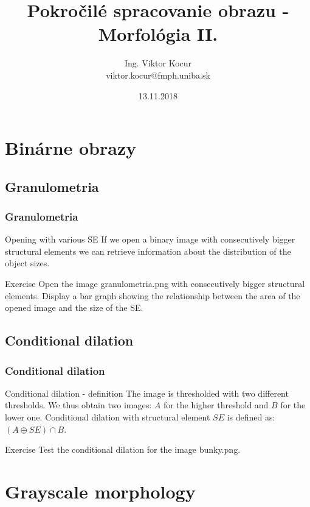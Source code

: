 \documentclass{beamer}
\title[8. cvičenie]{Pokročilé spracovanie obrazu - Morfológia II.}
\author[Kocur]{Ing. Viktor Kocur \\{\small viktor.kocur@fmph.uniba.sk}}
\institute{DAI FMFI UK}
\date{13.11.2018}
\begin{document}

\begin{frame}
  \titlepage
\end{frame}

\section{Binárne obrazy}
\subsection{Granulometria}

\begin{frame}
\frametitle{Granulometria}
  \begin{block}{Opening with various SE}
  If we open a binary image with consecutively bigger structural elements we can retrieve information about the distribution of the object sizes.
  \end{block}
  

  \begin{block}{Exercise}
  Open the image granulometria.png with consecutively bigger structural elements. Display a bar graph showing the relationship between the area of the opened image and the size of the SE.
  \end{block}
\end{frame}

\subsection{Conditional dilation}

\begin{frame}
\frametitle{Conditional dilation}
  \begin{block}{Conditional dilation - definition}
  The image is thresholded with two different thresholds. We thus obtain two images: $A$ for the higher threshold and $B$ for the lower one. Conditional dilation with structural element $SE$ is defined as: $(A \oplus SE) \cap B$.
  \end{block}  

  \begin{block}{Exercise}
  Test the conditional dilation for the image bunky.png.
  \end{block}
\end{frame}

\section{Grayscale morphology}
\end{document}
